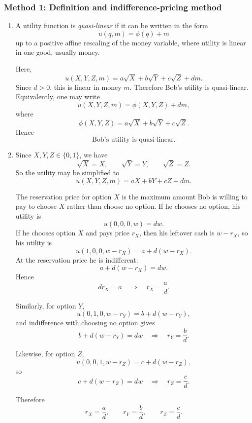 \documentclass[12pt]{article}
\begin{document}
\subsubsection{Method 1: Definition and indifference-pricing method}
\begin{enumerate}[label=(\alph*)]
    \item
    A utility function is \emph{quasi-linear} if it can be written in the form
    \[
    u(q,m)=\phi(q)+m
    \]
    up to a positive affine rescaling of the money variable, where utility is linear in one good, usually money.

    Here,
    \[
    u(X,Y,Z,m)=a\sqrt{X}+b\sqrt{Y}+c\sqrt{Z}+dm.
    \]
    Since \(d>0\), this is linear in money \(m\). Therefore Bob’s utility is quasi-linear. Equivalently, one may write
    \[
    u(X,Y,Z,m)=\phi(X,Y,Z)+dm,
    \]
    where
    \[
    \phi(X,Y,Z)=a\sqrt{X}+b\sqrt{Y}+c\sqrt{Z}.
    \]
    Hence
    \[
    \boxed{\text{Bob’s utility is quasi-linear.}}
    \]

\newpage
    \item
    Since \(X,Y,Z\in\{0,1\}\), we have
    \[
    \sqrt{X}=X,\qquad \sqrt{Y}=Y,\qquad \sqrt{Z}=Z.
    \]
    So the utility may be simplified to
    \[
    u(X,Y,Z,m)=aX+bY+cZ+dm.
    \]

    The reservation price for option \(X\) is the maximum amount Bob is willing to pay to choose \(X\) rather than choose no option. If he chooses no option, his utility is
    \[
    u(0,0,0,w)=dw.
    \]
    If he chooses option \(X\) and pays price \(r_X\), then his leftover cash is \(w-r_X\), so his utility is
    \[
    u(1,0,0,w-r_X)=a+d(w-r_X).
    \]
    At the reservation price he is indifferent:
    \[
    a+d(w-r_X)=dw.
    \]
    Hence
    \[
    dr_X=a
    \quad\Longrightarrow\quad
    \boxed{r_X=\frac{a}{d}.}
    \]

    Similarly, for option \(Y\),
    \[
    u(0,1,0,w-r_Y)=b+d(w-r_Y),
    \]
    and indifference with choosing no option gives
    \[
    b+d(w-r_Y)=dw
    \quad\Longrightarrow\quad
    \boxed{r_Y=\frac{b}{d}.}
    \]

    Likewise, for option \(Z\),
    \[
    u(0,0,1,w-r_Z)=c+d(w-r_Z),
    \]
    so
    \[
    c+d(w-r_Z)=dw
    \quad\Longrightarrow\quad
    \boxed{r_Z=\frac{c}{d}.}
    \]

    Therefore
    \[
    \boxed{
    r_X=\frac{a}{d},\qquad
    r_Y=\frac{b}{d},\qquad
    r_Z=\frac{c}{d}.
    }
    \]
\end{enumerate}
\end{document}
